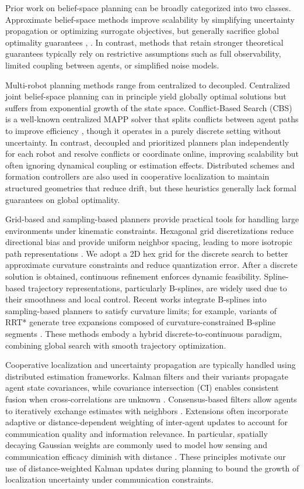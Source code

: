 
Prior work on belief-space planning can be broadly categorized into two classes. Approximate belief-space methods improve scalability by simplifying uncertainty propagation or optimizing surrogate objectives, but generally sacrifice global optimality guarantees \cite{platt2010belief}, \cite{theurkauf2025coop}. In contrast, methods that retain stronger theoretical guarantees typically rely on restrictive assumptions such as full observability, limited coupling between agents, or simplified noise models.

Multi-robot planning methods range from centralized to decoupled. Centralized joint belief-space planning can in principle yield globally optimal solutions but suffers from exponential growth of the state space. Conflict-Based Search (CBS) is a well-known centralized MAPP solver that splits conflicts between agent paths to improve efficiency \cite{sharon2021cbs}, though it operates in a purely discrete setting without uncertainty.  In contrast, decoupled and prioritized planners plan independently for each robot and resolve conflicts or coordinate online, improving scalability but often ignoring dynamical coupling or estimation effects.  Distributed schemes and formation controllers are also used in cooperative localization to maintain structured geometries that reduce drift, but these heuristics generally lack formal guarantees on global optimality.

Grid-based and sampling-based planners provide practical tools for handling large environments under kinematic constraints.  Hexagonal grid discretizations reduce directional bias and provide uniform neighbor spacing, leading to more isotropic path representations \cite{duszak2021hexgrid}.  We adopt a 2D hex grid for the discrete search to better approximate curvature constraints and reduce quantization error. After a discrete solution is obtained, continuous refinement enforces dynamic feasibility. Spline-based trajectory representations, particularly B-splines, are widely used due to their smoothness and local control. Recent works integrate B-splines into sampling-based planners to satisfy curvature limits; for example, variants of RRT* generate tree expansions composed of curvature-constrained B-spline segments \cite{feng2024bsrrt,karaman2011optimal}. These methods embody a hybrid discrete-to-continuous paradigm, combining global search with smooth trajectory optimization.

Cooperative localization and uncertainty propagation are typically handled using distributed estimation frameworks. Kalman filters and their variants propagate agent state covariances, while covariance intersection (CI) enables consistent fusion when cross-correlations are unknown \cite{julier1997cov}. Consensus-based filters allow agents to iteratively exchange estimates with neighbors \cite{olfati2007consensus}.  Extensions often incorporate adaptive or distance-dependent weighting of inter-agent updates to account for communication quality and information relevance.  In particular, spatially decaying Gaussian weights are commonly used to model how sensing and communication efficacy diminish with distance \cite{theurkauf2025coop}. These principles motivate our use of distance-weighted Kalman updates during planning to bound the growth of localization uncertainty under communication constraints.
